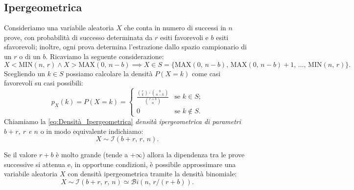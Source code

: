         \subsection{Ipergeometrica}
            \begin{defn}
                Consideriamo una variabile aleatoria $X$ che conta in numero di successi in $n$ prove, con probabilità di successo determinata da $r$ esiti favorevoli e $b$ esiti sfavorevoli; inoltre, ogni prova determina l'estrazione dallo spazio campionario di un $r$ o di un $b$.
                Ricaviamo la seguente considerazione: \[
                    X < \scriptstyle\text{MIN}\textstyle(n,\,r) \land X > \scriptstyle\text{MAX}\textstyle(0,\,n-b) \implies X \in S = \{\scriptstyle\text{MAX}\textstyle(0,\,n-b),\, \scriptstyle\text{MAX}\textstyle(0,\,n-b) + 1,\, \ldots,\, \scriptstyle\text{MIN}\textstyle(n,\,r)\}
                .\] Scegliendo un $k \in S$ possiamo calcolare la densità $P(X = k)$ come casi favorevoli su casi possibili:
                \begin{equation}\label{eq:Densità_Ipergeometrica}
                    p_X(k) = P(X = k) = \begin{cases}
                        \frac{\binom{r}{k} \cdot \binom{b}{n-k}}{\binom{r+b}{n}} & \text{se $k \in S$;} \\
                        0 & \text{se $k \notin S$.}
                    \end{cases}
                \end{equation}
                Chiamiamo la \eqref{eq:Densità_Ipergeometrica} \textit{densità ipergeometrica di parametri $b+r$, $r$ e $n$} o in modo equivalente indichiamo: \[
                    X \sim \mathcal{I}(b+r,\, r,\, n)
                .\] 
            \end{defn}
            \begin{obsv}
                Se il valore $r+b$ è molto grande (tende a $+\infty$) allora la dipendenza tra le prove successive si attenua e, in opportune condizioni, è possibile approssimare una variabile aleatoria $X$ con densità ipergeometrica tramite la densità binomiale: \[
                    X \sim \mathcal{I}(b+r,\, r,\, n) \simeq \mathcal{B}i(n,\, r / (r+b))
                .\] 
            \end{obsv}
